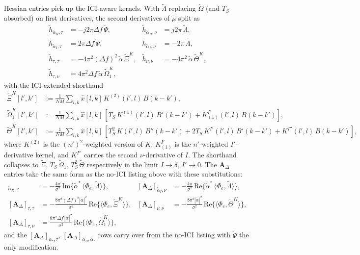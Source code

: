 \documentclass[11pt]{article}
\begin{document}
Hessian entries pick up the ICI-aware kernels. With \(\tilde{\Lambda}\) replacing \(\tilde{\Omega}\) (and \(T_S\) absorbed) on first derivatives, the second derivatives of \(\tilde\mu\) split as
\begin{align}
    \tilde{h}_{\tilde{\alpha}_R, \tau} &= -j2\pi\Delta f\, \tilde{\Psi}, &
    \tilde{h}_{\tilde{\alpha}_R, \nu} &= j2\pi\, \tilde{\Lambda}, \\
    \tilde{h}_{\tilde{\alpha}_I, \tau} &= 2\pi\Delta f\, \tilde{\Psi}, &
    \tilde{h}_{\tilde{\alpha}_I, \nu} &= -2\pi\, \tilde{\Lambda}, \\
    \tilde{h}_{\tau, \tau} &= -4\pi^2 (\Delta f)^2\, \tilde{\alpha}\, \tilde{\Xi}^K, &
    \tilde{h}_{\nu, \nu} &= -4\pi^2\, \tilde{\alpha}\, \tilde{\Theta}^K, \\
    \tilde{h}_{\tau, \nu} &= 4\pi^2 \Delta f\, \tilde{\alpha}\, \tilde{\Omega}_1^K, & &
\end{align}
with the ICI-extended shorthand
\begin{align}
    \tilde{\Xi}^K[l',k']      &:= \tfrac{1}{NM}\sum_{l,k} \hat{x}[l,k]\, K^{(2)}(l',l)\, B(k-k'), \\
    \tilde{\Omega}_1^K[l',k'] &:= \tfrac{1}{NM}\sum_{l,k} \hat{x}[l,k]\, \left[ T_S\, K^{(1)}(l',l)\, B'(k-k') + K_{(1)}^{I'}(l',l)\, B(k-k') \right], \\
    \tilde{\Theta}^K[l',k']   &:= \tfrac{1}{NM}\sum_{l,k} \hat{x}[l,k]\, \left[ T_S^2\, K(l',l)\, B''(k-k') + 2 T_S\, K^{I'}(l',l)\, B'(k-k') + K^{I''}(l',l)\, B(k-k') \right],
\end{align}
where \(K^{(2)}\) is the \((n')^2\)-weighted version of \(K\), \(K_{(1)}^{I'}\) is the \(n'\)-weighted \(I'\)-derivative kernel, and \(K^{I''}\) carries the second \(\nu\)-derivative of \(I\). The shorthand collapses to \(\tilde{\Xi},\, T_S\, \tilde{\Omega}_1,\, T_S^2\, \tilde{\Theta}\) respectively in the limit \(I \to \delta\), \(I' \to 0\). The \(\bm{A}_\Delta\) entries take the same form as the no-ICI listing above with these substitutions:
\begin{align}
    [\bm{A}_\Delta]_{\tilde{\alpha}_R, \nu} &= -\tfrac{4\pi}{\sigma^2}\, \mathrm{Im}\{\tilde{\alpha}^*\, \langle \Phi_e, \tilde{\Lambda}\rangle\}, &
    [\bm{A}_\Delta]_{\tilde{\alpha}_I, \nu} &= -\tfrac{4\pi}{\sigma^2}\, \mathrm{Re}\{\tilde{\alpha}^*\, \langle \Phi_e, \tilde{\Lambda}\rangle\}, \\
    [\bm{A}_\Delta]_{\tau, \tau} &= -\tfrac{8\pi^2 (\Delta f)^2 |\tilde{\alpha}|^2}{\sigma^2}\, \mathrm{Re}\{\langle \Phi_e, \tilde{\Xi}^K\rangle\}, &
    [\bm{A}_\Delta]_{\nu, \nu} &= -\tfrac{8\pi^2 |\tilde{\alpha}|^2}{\sigma^2}\, \mathrm{Re}\{\langle \Phi_e, \tilde{\Theta}^K\rangle\}, \\
    [\bm{A}_\Delta]_{\tau, \nu} &= \tfrac{8\pi^2 \Delta f\, |\tilde{\alpha}|^2}{\sigma^2}\, \mathrm{Re}\{\langle \Phi_e, \tilde{\Omega}_1^K\rangle\}, & &
\end{align}
and the \([\bm{A}_\Delta]_{\tilde{\alpha}_*, \tau}\), \([\bm{A}_\Delta]_{\tilde{\alpha}_R, \tilde{\alpha}_*}\) rows carry over from the no-ICI listing with \(\tilde{\Psi}\) the only modification.
\end{document}

